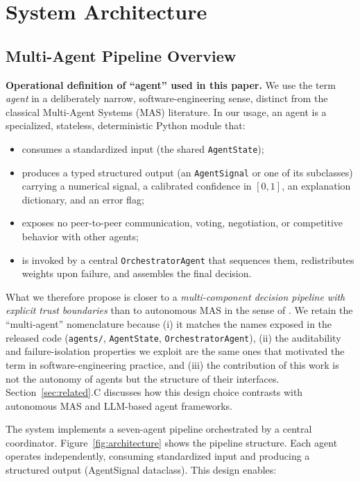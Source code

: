 \documentclass[conference]{IEEEtran}
\begin{document}
\section{System Architecture}\label{sec:architecture}

\subsection{Multi-Agent Pipeline Overview}

\textbf{Operational definition of ``agent'' used in this paper.} We use the term \emph{agent} in a deliberately narrow, software-engineering sense, distinct from the classical Multi-Agent Systems (MAS) literature. In our usage, an agent is a specialized, stateless, deterministic Python module that:
\begin{itemize}
    \item consumes a standardized input (the shared \texttt{AgentState});
    \item produces a typed structured output (an \texttt{AgentSignal} or one of its subclasses) carrying a numerical signal, a calibrated confidence in $[0,1]$, an explanation dictionary, and an error flag;
    \item exposes no peer-to-peer communication, voting, negotiation, or competitive behavior with other agents;
    \item is invoked by a central \texttt{OrchestratorAgent} that sequences them, redistributes weights upon failure, and assembles the final decision.
\end{itemize}
What we therefore propose is closer to a \emph{multi-component decision pipeline with explicit trust boundaries} than to autonomous MAS in the sense of \cite{ref:multi_agent}. We retain the ``multi-agent'' nomenclature because (i) it matches the names exposed in the released code (\texttt{agents/}, \texttt{AgentState}, \texttt{OrchestratorAgent}), (ii) the auditability and failure-isolation properties we exploit are the same ones that motivated the term in software-engineering practice, and (iii) the contribution of this work is not the autonomy of agents but the structure of their interfaces. Section~\ref{sec:related}.C discusses how this design choice contrasts with autonomous MAS and LLM-based agent frameworks.

The system implements a seven-agent pipeline orchestrated by a central coordinator. Figure~\ref{fig:architecture} shows the pipeline structure. Each agent operates independently, consuming standardized input and producing a structured output (AgentSignal dataclass). This design enables:
\end{document}
